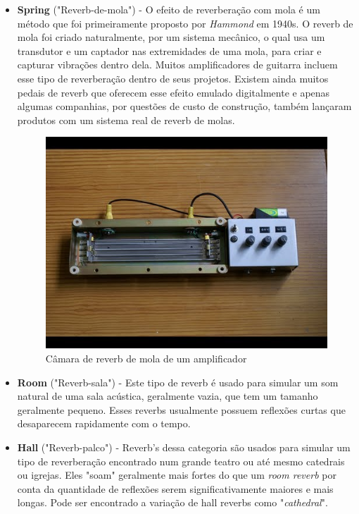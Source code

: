 		\begin{itemize}
			\item \textbf{Spring} ("Reverb-de-mola") - O efeito de reverberação com mola é um método que foi primeiramente proposto por \textit{Hammond} em 1940s. O reverb de mola foi criado naturalmente, por um sistema mecânico, o qual usa um transdutor e um captador nas extremidades de uma mola, para criar e capturar vibrações dentro dela. Muitos amplificadores de guitarra incluem esse tipo de reverberação dentro de seus projetos. Existem ainda muitos pedais de reverb que oferecem esse efeito emulado digitalmente e apenas algumas companhias, por questões de custo de construção, também lançaram produtos com um sistema real de reverb de molas.
			
			\begin{figure}[!h]
				\centering
				\includegraphics[scale=0.3]{./figuras/spring-reverb.jpg}
				\caption{Câmara de reverb de mola de um amplificador}
				\label{spring-reverb}
			\end{figure}
			
			\item \textbf{Room} ("Reverb-sala") - Este tipo de reverb é usado para simular um som natural de uma sala acústica, geralmente vazia, que tem um tamanho geralmente pequeno. Esses reverbs usualmente possuem reflexões curtas que desaparecem rapidamente com o tempo. 
			
			\item \textbf{Hall} ("Reverb-palco") - Reverb's dessa categoria são usados para simular um tipo de reverberação encontrado num grande teatro ou até mesmo catedrais ou igrejas. Eles "soam" geralmente mais fortes do que um \textit{room reverb} por conta da quantidade de reflexões serem significativamente maiores e mais longas. Pode ser encontrado a variação de hall reverbs como "\textit{cathedral}".
			

\end{itemize}
